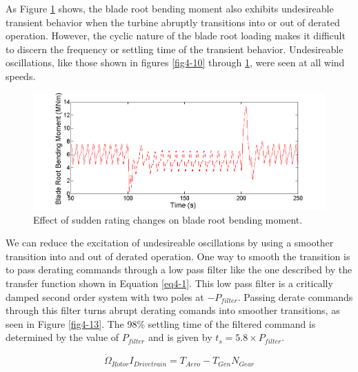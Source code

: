 As Figure \ref{fig4-12} shows, the blade root bending moment also exhibits undesireable transient behavior when the turbine abruptly transitions into or out of derated operation. However, the cyclic nature of the blade root loading makes it difficult to discern the frequency or settling time of the transient behavior. Undesireable oscillations, like those shown in figures \ref{fig4-10} through \ref{fig4-12}, were seen at all wind speeds.

\begin{figure}[htbp]
	\centering
		\includegraphics[trim = {1cm 0 2cm 0}, clip, width = \linewidth]{Figures/ch4Figures/fig4-12.png}
		
	\caption{Effect of sudden rating changes on blade root bending moment.}
	\label{fig4-12}
\end{figure}

We can reduce the excitation of undesireable oscillations by using a smoother transition into and out of derated operation. One way to smooth the transition is to pass derating commands through a low pass filter like the one described by the transfer function shown in Equation \ref{eq4-1}. This low pass filter is a critically damped second order system with two poles at $-P_{filter}$. Passing derate commands through this filter turns abrupt derating comands into smoother transitions, as seen in Figure \ref{fig4-13}. The 98$\%$ settling time of the filtered command is determined by the value of $P_{filter}$ and is given by $t_s = 5.8\times P_{filter}$.

\begin{equation}
	\dot{\Omega }_{Rotor}I_{Drivetrain}=T_{Aero}-T_{Gen}N_{Gear} \label{eq4-1}
\end{equation}

%		

